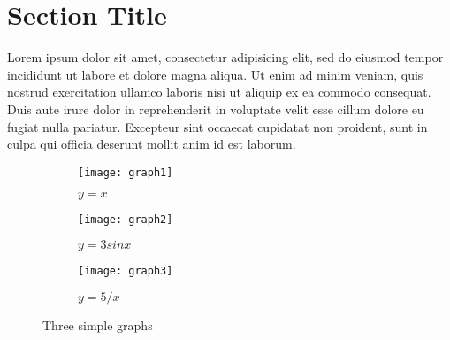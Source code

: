 
    \section{Section Title}
        Lorem ipsum dolor sit amet, consectetur adipisicing elit, sed do eiusmod tempor incididunt ut labore et dolore magna aliqua. Ut enim ad minim veniam, quis nostrud exercitation ullamco laboris nisi ut aliquip ex ea commodo consequat. Duis aute irure dolor in reprehenderit in voluptate velit esse cillum dolore eu fugiat nulla pariatur. Excepteur sint occaecat cupidatat non proident, sunt in culpa qui officia deserunt mollit anim id est laborum.

        \begin{figure}
            \centering
            \begin{subfigure}[b]{0.3\textwidth}
                \centering
                \texttt{[image: graph1]}
                \caption{$y=x$}
                \label{fig:y equals x}
            \end{subfigure}
            \hfill
            \begin{subfigure}[b]{0.3\textwidth}
                \centering
                \texttt{[image: graph2]}
                \caption{$y=3sinx$}
                \label{fig:three sin x}
            \end{subfigure}
            \hfill
            \begin{subfigure}[b]{0.3\textwidth}
                \centering
                \texttt{[image: graph3]}
                \caption{$y=5/x$}
                \label{fig:five over x}
            \end{subfigure}
            \caption{Three simple graphs}
            \label{fig:three graphs}
        \end{figure}


        \ifx\usepgf\true 


